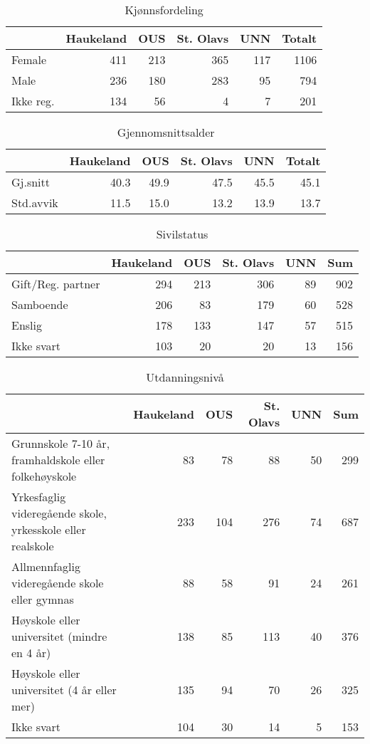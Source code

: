 \documentclass[norsk,a4paper]{article}\usepackage[]{graphicx}\usepackage[]{color}
\begin{document}
\begin{table}[ht]
\centering
\begin{tabular}{lrrrrr}
  \hline
 & Haukeland & OUS & St. Olavs & UNN & Totalt \\ 
  \hline
Female & 411 & 213 & 365 & 117 & 1106 \\ 
  Male & 236 & 180 & 283 & 95 & 794 \\ 
  Ikke reg. & 134 & 56 & 4 & 7 & 201 \\ 
   \hline
\end{tabular}
\caption{Kjønnsfordeling} 
\end{table}
\begin{table}[ht]
\centering
\begin{tabular}{lrrrrr}
  \hline
 & Haukeland & OUS & St. Olavs & UNN & Totalt \\ 
  \hline
Gj.snitt & 40.3 & 49.9 & 47.5 & 45.5 & 45.1 \\ 
  Std.avvik & 11.5 & 15.0 & 13.2 & 13.9 & 13.7 \\ 
   \hline
\end{tabular}
\caption{Gjennomsnittsalder} 
\end{table}
\begin{table}[ht]
\centering
\begin{tabular}{lrrrrr}
  \hline
 & Haukeland & OUS & St. Olavs & UNN & Sum \\ 
  \hline
Gift/Reg. partner & 294 & 213 & 306 & 89 & 902 \\ 
  Samboende & 206 & 83 & 179 & 60 & 528 \\ 
  Enslig & 178 & 133 & 147 & 57 & 515 \\ 
  Ikke svart & 103 & 20 & 20 & 13 & 156 \\ 
   \hline
\end{tabular}
\caption{Sivilstatus} 
\end{table}
\begin{table}[ht]
\centering
\begin{tabular}{lrrrrr}
  \hline
 & Haukeland & OUS & St. Olavs & UNN & Sum \\ 
  \hline
Grunnskole 7-10 år, framhaldskole eller folkehøyskole & 83 & 78 & 88 & 50 & 299 \\ 
  Yrkesfaglig videregående skole, yrkesskole eller realskole & 233 & 104 & 276 & 74 & 687 \\ 
  Allmennfaglig videregående skole eller gymnas & 88 & 58 & 91 & 24 & 261 \\ 
  Høyskole eller universitet (mindre en 4 år) & 138 & 85 & 113 & 40 & 376 \\ 
  Høyskole eller universitet (4 år eller mer) & 135 & 94 & 70 & 26 & 325 \\ 
  Ikke svart & 104 & 30 & 14 & 5 & 153 \\ 
   \hline
\end{tabular}
\caption{Utdanningsnivå} 
\end{table}
\end{document}
